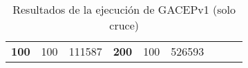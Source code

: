 \begin{table}[H]
\begin{tabular}{|ccrccrccc}
\multicolumn{1}{|c|}{\multirow{-39}{*}{\cellcolor[HTML]{FFFFC7}\textbf{100}}} & \multicolumn{1}{c|}{\multirow{-9}{*}{\cellcolor[HTML]{DDFDFF}100}} & \multicolumn{1}{r|}{\cellcolor[HTML]{DAE8FC}111587}    & \multicolumn{1}{c|}{\multirow{-39}{*}{\cellcolor[HTML]{FFFFC7}\textbf{200}}} & \multicolumn{1}{c|}{\multirow{-10}{*}{\cellcolor[HTML]{DDFDFF}100}} & \multicolumn{1}{r|}{\cellcolor[HTML]{DDFDFF}526593}    &                                                                              &                                                                    &                                                        \\ \cline{1-6}
\end{tabular}
\caption{\label{HistCruce}Resultados de la ejecución de GACEPv1 (solo cruce)}
\end{table}

